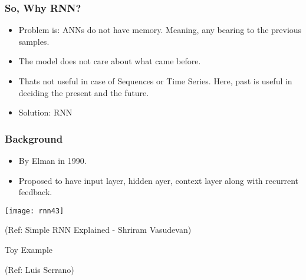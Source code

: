 \begin{frame}[fragile] \frametitle{So, Why RNN?}

\begin{itemize}
\item Problem is: ANNs do not have memory. Meaning, any bearing to the previous samples.
\item The model does not care about what came before.
\item Thats not useful in case of Sequences or Time Series. Here, past is useful in deciding the present and the future.
\item Solution: RNN
\end{itemize}


\end{frame}


\begin{frame}[fragile] \frametitle{Background}

\begin{itemize}
\item By Elman in 1990.
\item Proposed to have input layer, hidden ayer, context layer along with recurrent feedback.
\end{itemize}

\begin{center}
\texttt{[image: rnn43]}
\end{center}

{\tiny (Ref: Simple RNN Explained - Shriram Vasudevan)}

\end{frame}

\begin{frame}
  \begin{center}
    {\Large Toy Example}
		
		{\tiny (Ref: Luis Serrano)}
  \end{center}
\end{frame}

